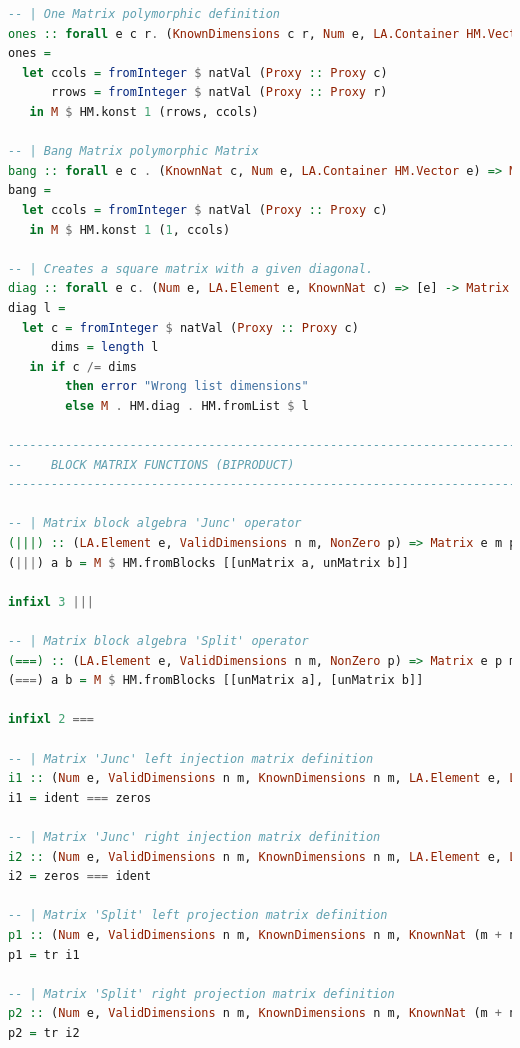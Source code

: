 \documentclass[
  oneside,
  11pt, a4paper,
  footinclude=true,
  headinclude=true,
  cleardoublepage=empty
]{scrbook}
\theoremstyle{definition}
\theoremstyle{definition}
\begin{document}
\begin{lstlisting}[language=Haskell, caption={Matrix.Internal},captionpos=b]
-- | One Matrix polymorphic definition
ones :: forall e c r. (KnownDimensions c r, Num e, LA.Container HM.Vector e) => Matrix e c r
ones =
  let ccols = fromInteger $ natVal (Proxy :: Proxy c)
      rrows = fromInteger $ natVal (Proxy :: Proxy r)
   in M $ HM.konst 1 (rrows, ccols)

-- | Bang Matrix polymorphic Matrix
bang :: forall e c . (KnownNat c, Num e, LA.Container HM.Vector e) => Matrix e c 1
bang =
  let ccols = fromInteger $ natVal (Proxy :: Proxy c)
   in M $ HM.konst 1 (1, ccols)

-- | Creates a square matrix with a given diagonal.
diag :: forall e c. (Num e, LA.Element e, KnownNat c) => [e] -> Matrix e c c
diag l =
  let c = fromInteger $ natVal (Proxy :: Proxy c)
      dims = length l
   in if c /= dims
        then error "Wrong list dimensions"
        else M . HM.diag . HM.fromList $ l

-------------------------------------------------------------------------------
--    BLOCK MATRIX FUNCTIONS (BIPRODUCT)
-------------------------------------------------------------------------------

-- | Matrix block algebra 'Junc' operator
(|||) :: (LA.Element e, ValidDimensions n m, NonZero p) => Matrix e m p -> Matrix e n p -> Matrix e (m + n) p
(|||) a b = M $ HM.fromBlocks [[unMatrix a, unMatrix b]]

infixl 3 |||

-- | Matrix block algebra 'Split' operator
(===) :: (LA.Element e, ValidDimensions n m, NonZero p) => Matrix e p m -> Matrix e p n -> Matrix e p (m + n)
(===) a b = M $ HM.fromBlocks [[unMatrix a], [unMatrix b]]

infixl 2 ===

-- | Matrix 'Junc' left injection matrix definition
i1 :: (Num e, ValidDimensions n m, KnownDimensions n m, LA.Element e, LA.Container HM.Vector e) => Matrix e m (m + n)
i1 = ident === zeros

-- | Matrix 'Junc' right injection matrix definition
i2 :: (Num e, ValidDimensions n m, KnownDimensions n m, LA.Element e, LA.Container HM.Vector e) => Matrix e n (m + n)
i2 = zeros === ident

-- | Matrix 'Split' left projection matrix definition
p1 :: (Num e, ValidDimensions n m, KnownDimensions n m, KnownNat (m + n), LA.Element e, LA.Container HM.Vector e) => Matrix e (m + n) m
p1 = tr i1

-- | Matrix 'Split' right projection matrix definition
p2 :: (Num e, ValidDimensions n m, KnownDimensions n m, KnownNat (m + n), LA.Element e, LA.Container HM.Vector e) => Matrix e (m + n) n
p2 = tr i2


\end{lstlisting}
\end{document}
